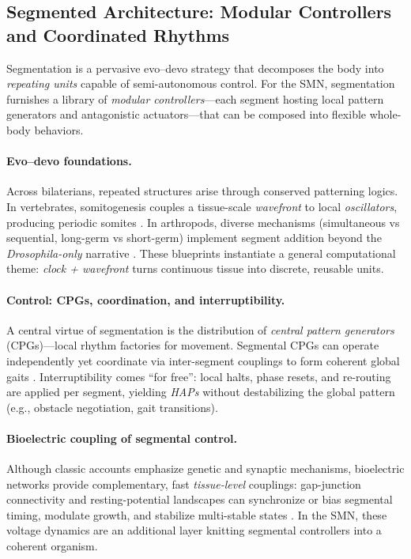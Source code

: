
\subsection{Segmented Architecture: Modular Controllers and Coordinated Rhythms}
\label{subsec:segmented}

Segmentation is a pervasive evo--devo strategy that decomposes the body into \emph{repeating units} capable of semi-autonomous control. 
For the SMN, segmentation furnishes a library of \emph{modular controllers}---each segment hosting local pattern generators and antagonistic actuators---that can be composed into flexible whole-body behaviors.

\paragraph{Evo--devo foundations.}
Across bilaterians, repeated structures arise through conserved patterning logics.
In vertebrates, somitogenesis couples a tissue-scale \emph{wavefront} to local \emph{oscillators}, producing periodic somites \cite{CookeZeeman1976ClockWavefront,Pourquie2003SegmentationClock,Pourquie2011SegmentationClock}.
In arthropods, diverse mechanisms (simultaneous vs sequential, long-germ vs short-germ) implement segment addition beyond the \emph{Drosophila-only} narrative \cite{PeelChipmanAkam2005ArthropodSegmentation}.
These blueprints instantiate a general computational theme: \emph{clock + wavefront} turns continuous tissue into discrete, reusable units.

\paragraph{Control: CPGs, coordination, and interruptibility.}
A central virtue of segmentation is the distribution of \emph{central pattern generators} (CPGs)---local rhythm factories for movement.
Segmental CPGs can operate independently yet coordinate via inter-segment couplings to form coherent global gaits \cite{MarderBucher2001CPG,Grillner2006Lamprey,Ijspeert2008CPG}.
Interruptibility comes ``for free'': local halts, phase resets, and re-routing are applied per segment, yielding \emph{HAPs} without destabilizing the global pattern (e.g., obstacle negotiation, gait transitions).

\paragraph{Bioelectric coupling of segmental control.}
Although classic accounts emphasize genetic and synaptic mechanisms, bioelectric networks provide complementary, fast \emph{tissue-level} couplings: gap-junction connectivity and resting-potential landscapes can synchronize or bias segmental timing, modulate growth, and stabilize multi-stable states \cite{Levin2014MolecularBioelectricity}.
In the SMN, these voltage dynamics are an additional layer knitting segmental controllers into a coherent organism.

